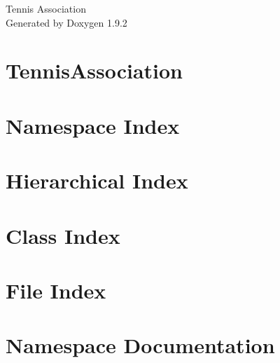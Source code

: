 \documentclass[twoside]{book}
\newcommand{\+}{\discretionary{\mbox{\scriptsize$\hookleftarrow$}}{}{}}
\newcommand{\clearemptydoublepage}{%
    \newpage{\pagestyle{empty}\cleardoublepage}%
  }
\begin{document}
  \raggedbottom
    \hypersetup{pageanchor=false,
                bookmarksnumbered=true,
                pdfencoding=unicode
               }
  \begin{titlepage}
  \vspace*{7cm}
  \begin{center}%
  {\Large Tennis Association}\\
  \vspace*{1cm}
  {\large Generated by Doxygen 1.9.2}\\
  \end{center}
  \end{titlepage}
  \clearemptydoublepage
  \tableofcontents
  \clearemptydoublepage
  \hypersetup{pageanchor=true}
\chapter{Tennis\+Association}
\label{index}\hypertarget{index}{}
\chapter{Namespace Index}

\chapter{Hierarchical Index}

\chapter{Class Index}

\chapter{File Index}

\chapter{Namespace Documentation}






\end{document}
